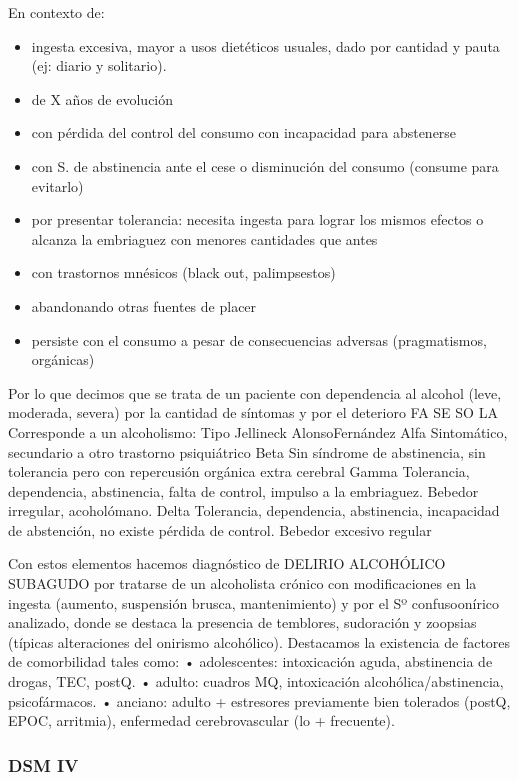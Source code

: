 En contexto de:
\begin{itemize}
\item ingesta excesiva, mayor a usos dietéticos usuales, dado por cantidad y pauta (ej: diario y solitario).
\item de X años de evolución
\item con pérdida del control del consumo con incapacidad para abstenerse
\item con S. de abstinencia ante el cese o disminución del consumo (consume para evitarlo)
\item por presentar tolerancia: necesita ingesta para lograr los mismos efectos o alcanza la embriaguez con menores cantidades que antes
\item con trastornos mnésicos (black out, palimpsestos)
\item abandonando otras fuentes de placer
\item persiste con el consumo a pesar de consecuencias adversas (pragmatismos, orgánicas)
\end{itemize}
Por lo que decimos que se trata de un paciente con dependencia al alcohol (leve, moderada, severa) por la cantidad de síntomas y por el deterioro FA SE SO LA Corresponde a un alcoholismo: Tipo Jellineck Alonso\-Fernández Alfa Sintomático, secundario a otro trastorno psiquiátrico Beta Sin síndrome de abstinencia, sin tolerancia pero con repercusión orgánica extra cerebral Gamma Tolerancia, dependencia, abstinencia, falta de control, impulso a la embriaguez. Bebedor irregular, acoholómano. Delta Tolerancia, dependencia, abstinencia, incapacidad de abstención, no existe pérdida de control. Bebedor excesivo regular

Con estos elementos hacemos diagnóstico de DELIRIO ALCOHÓLICO SUBAGUDO por tratarse de un alcoholista crónico con modificaciones en la ingesta (aumento, suspensión brusca, mantenimiento) y por el Sº confuso\-onírico analizado, donde se destaca la presencia de temblores, sudoración y zoopsias (típicas alteraciones del onirismo alcohólico). Destacamos la existencia de factores de comorbilidad tales como: • adolescentes: intoxicación aguda, abstinencia de drogas, TEC, postQ. • adulto: cuadros MQ, intoxicación alcohólica/abstinencia, psicofármacos. • anciano: adulto + estresores previamente bien tolerados (postQ, EPOC, arritmia), enfermedad cerebrovascular (lo + frecuente).
\subsubsection{DSM IV}

